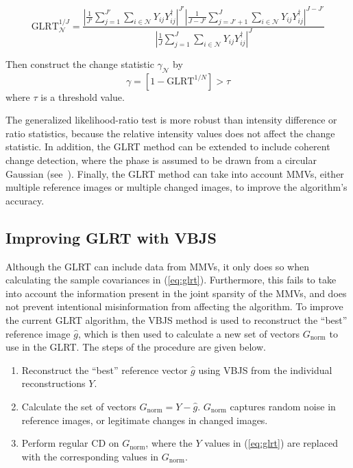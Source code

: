 \documentclass{article}
\begin{document}
\begin{equation}\label{eq:glrt}
    \text{GLRT}^{1/J}_{\mathcal{N}} = \frac{
        \left|\frac{1}{J'} \sum_{j=1}^{J'} \sum_{i \in \mathcal{N}}
                    Y_{ij}Y_{ij}^\dagger \right|^{J'} %
        \left|\frac{1}{J-J'} \sum_{j=J'+1}^{J} \sum_{i \in \mathcal{N}}
                    Y_{ij}Y_{ij}^\dagger \right|^{J-J'}}%
        {\left|\frac{1}{J} \sum_{j=1}^J \sum_{i \in \mathcal{N}}
                    Y_{ij}Y_{ij}^\dagger \right|^J} %
\end{equation}

Then construct the change statistic $\gamma_\mathcal{N}$ by
\begin{equation}
    \gamma = \left[ 1-\text{GLRT}^{1/N} \right] > \tau
\end{equation}
where $\tau$ is a threshold value.

The generalized likelihood-ratio test is more robust than intensity difference or ratio statistics, because the relative intensity values does not affect the change statistic. In addition, the GLRT method can be extended to include coherent change detection, where the phase is assumed to be drawn from a circular Gaussian (see~\cite{Ash_2014}). Finally, the GLRT method can take into account MMVs, either multiple reference images or multiple changed images, to improve the algorithm's accuracy.

\subsection{Improving GLRT with VBJS}

Although the GLRT can include data from MMVs, it only does so when calculating the sample covariances in (\ref{eq:glrt}). Furthermore, this fails to take into account the information present in the joint sparsity of the MMVs, and does not prevent intentional misinformation from affecting the algorithm. To improve the current GLRT algorithm, the VBJS method is used to reconstruct the ``best'' reference image $\hat{g}$, which is then used to calculate a new set of vectors $G_\text{norm}$ to use in the GLRT. The steps of the procedure are given below.

\begin{enumerate}
    \item Reconstruct the ``best'' reference vector $\hat{g}$ using VBJS from the individual reconstructions $Y$.
    \item Calculate the set of vectors $G_\text{norm} = Y - \hat{g}$. $G_\text{norm}$ captures random noise in reference images, or legitimate changes in changed images.
    \item Perform regular CD on $G_\text{norm}$, where the $Y$ values in (\ref{eq:glrt}) are replaced with the corresponding values in $G_\text{norm}$.
\end{enumerate}
\end{document}

